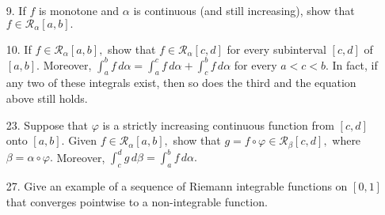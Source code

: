 \documentclass{article}
\begin{document}
\begin{itemize}
	\item[9.] If $f$ is monotone and $\alpha$ is continuous (and still increasing), show that $f\in \mathcal R_\alpha[a, b].$

	\item[10.] If $f\in\mathcal R_\alpha[a, b],$ show that $f\in \mathcal R_\alpha[c, d]$ for every subinterval $[c, d]$ of $[a, b].$ Moreover, $\int_a^b f\, d\alpha = \int_a^c f\, d\alpha + \int_c^b f\, d\alpha$ for every $a<c<b.$ In fact, if any two of these integrals exist, then so does the third and the equation above still holds.

	\item[23.] Suppose that $\varphi$ is a strictly increasing continuous function from $[c, d]$ onto $[a, b].$ Given $f\in\mathcal R_\alpha[a, b],$ show that $g=f\circ \varphi\in \mathcal R_\beta[c, d],$ where $\beta=\alpha\circ\varphi.$ Moreover, $\int_c^d g\, d\beta=\int_a^b f\, d\alpha.$

	\item[27.] Give an example of a sequence of Riemann integrable functions on $[0, 1]$ that converges pointwise to a non-integrable function.
		
\end{itemize}
\end{document}
